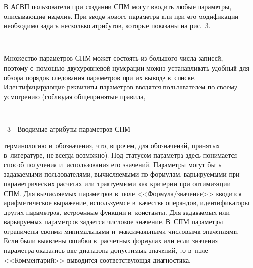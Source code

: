 \begin{multicols}{2}
  В АСВП пользователи при создании СПМ могут вводить любые па\-ра\-мет\-ры, 
описывающие изделие. При вводе нового па\-ра\-мет\-ра или при его модификации 
необходимо задать несколько атрибутов, которые показаны на рис.~3.
  
\setcounter{figure}{3}
\begin{figure*}[b] %
\vspace*{-3pt}
      \begin{center}
     \mbox{%
\epsfxsize=95.758mm 
}
\end{center}
\vspace*{-9pt}
\end{figure*}

   Множество параметров СПМ может состоять из большого числа записей, 
поэтому с~по\-мощью двухуровневой нумерации мож\-но устанавливать 
удобный для обзора порядок следования па\-ра\-мет\-ров при их выводе в~списке. 
Идентифицирующие реквизиты па\-ра\-мет\-ров вводятся пользователем по 
своему усмот\-ре\-нию (соблюдая общепринятые правила,\linebreak\vspace*{-12pt}

{ \begin{center}  %
 \vspace*{-3pt}
    \mbox{%
\epsfxsize=79mm 
}


\vspace*{6pt}



\noindent
{{\figurename~3}\ \ \small{Вводимые атрибуты па\-ра\-мет\-ров СПМ
}}
\end{center}
}

\vspace*{9pt}


\noindent
 терминологию 
и~обозначения, что, впрочем, для обозначений, принятых в~литературе, не 
всегда возможно). Под статусом параметра здесь понимается способ 
получения и~использования его значений. Па\-ра\-мет\-ры могут быть 
задаваемыми пользователями, вы\-чис\-ля\-емы\-ми по формулам, варьируемыми 
при параметрических расчетах или трактуемыми как критерии при 
оптимизации СПМ. Для вы\-чис\-ля\-емых па\-ра\-мет\-ров в~поле  
<<Фор\-му\-ла/зна\-че\-ние>> вводится арифметическое выражение, 
ис\-поль\-зу\-емое в~качестве операндов, идентификаторы других па\-ра\-мет\-ров, 
встроенные функции и~константы. Для за\-да\-ва\-емых или варь\-и\-ру\-емых 
параметров задается чис\-ло\-вое значение. В~СПМ па\-ра\-мет\-ры ограничены 
своими минимальными и~максимальными чис\-ло\-вы\-ми значениями. Если были 
выявлены ошиб\-ки в~расчетных формулах или если значения па\-ра\-мет\-ра 
оказались вне диапазона до\-пус\-ти\-мых значений, то в~поле <<Комментарий>> 
выводится со\-от\-вет\-ст\-ву\-ющая диагностика.





\end{multicols}
